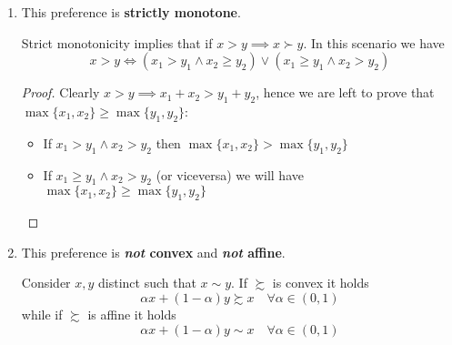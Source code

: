 \documentclass[12pt]{extarticle}
\numberwithin{table}{section}
\numberwithin{figure}{section}
\numberwithin{equation}{section}
\begin{document}
\begin{enumerate}[label=\alph*.)]
    \item This preference is \textbf{strictly monotone}.

          Strict monotonicity implies that if $x > y \implies x \succ y$.
          In this scenario we have
          \begin{equation}
              x > y \iff (x_1 > y_1 \land x_2 \geq y_2) \lor (x_1 \geq y_1 \land x_2 > y_2)
          \end{equation}

          \begin{proof}
              Clearly $x > y \implies x_1 + x_2 > y_1 + y_2$, hence we are left to prove that $\max\{ x_1, x_2 \} \geq \max\{ y_1, y_2 \}$:
              \begin{itemize}
                  \item If $x_1 > y_1 \land x_2 > y_2$ then $\max\{ x_1, x_2 \} > \max\{ y_1, y_2 \}$
                  \item If $x_1 \geq y_1\land x_2 > y_2$ (or viceversa) we will have
                        $\max\{ x_1, x_2 \} \geq \max\{ y_1, y_2 \}$
              \end{itemize}
          \end{proof}

    \item This preference is \textbf{\emph{not} convex} and \textbf{\emph{not} affine}.

          Consider $x, y$ distinct such that $x \sim y$. If $\succsim$ is convex it holds
          \begin{equation}
              \alpha x + (1-\alpha)y \succsim x \quad \forall \alpha \in (0, 1)
          \end{equation}
          while if $\succsim$ is affine it holds
          \begin{equation}
              \alpha x + (1-\alpha)y \sim x \quad \forall \alpha \in (0, 1)
          \end{equation}


\end{enumerate}
\end{document}
